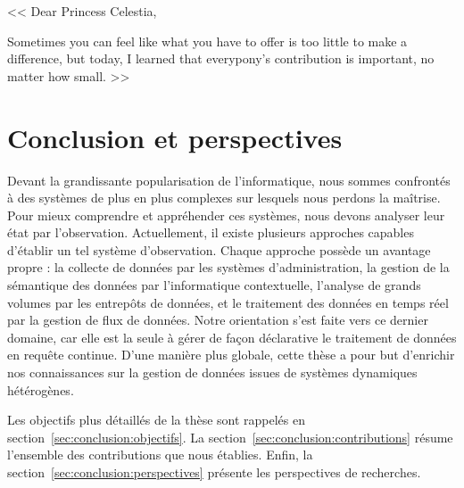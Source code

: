 \begin{savequote}[.5\textwidth]
<< Dear Princess Celestia,

\quad Sometimes you can feel like what you have to offer is too little to make a difference, but today, I learned that everypony's contribution is important, no matter how small. >>
\end{savequote}

\chapter{Conclusion et perspectives}\label{chap:conclusion}
\chaptertoc

Devant la grandissante popularisation de l'informatique, nous sommes confrontés à des systèmes de plus en plus complexes sur lesquels nous perdons la maîtrise. Pour mieux comprendre et appréhender ces systèmes, nous devons analyser leur état par l'observation. Actuellement, il existe plusieurs approches capables d'établir un tel système d'observation. Chaque approche possède un avantage propre : la collecte de données par les systèmes d'administration, la gestion de la sémantique des données par l'informatique contextuelle, l'analyse de grands volumes par les entrepôts de données, et le traitement des données en temps réel par la gestion de flux de données. Notre orientation s'est faite vers ce dernier domaine, car elle est la seule à gérer de façon déclarative le traitement de données en requête continue. D'une manière plus globale, cette thèse a pour but d'enrichir nos connaissances sur la gestion de données issues de systèmes dynamiques hétérogènes. 

Les objectifs plus détaillés de la thèse sont rappelés en section~\ref{sec:conclusion:objectifs}. La section~\ref{sec:conclusion:contributions} résume l'ensemble des contributions que nous établies. Enfin, la section~\ref{sec:conclusion:perspectives} présente les perspectives de recherches.




